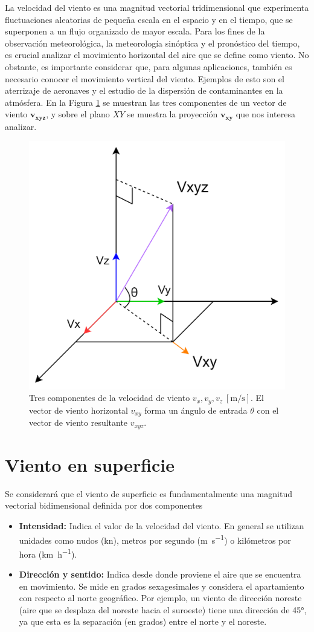  La velocidad del viento es una magnitud vectorial tridimensional que experimenta fluctuaciones aleatorias de pequeña escala en el espacio y en el tiempo, que se superponen a un flujo organizado de mayor escala. Para los fines de la observación meteorológica, la meteorología sinóptica y el pronóstico del tiempo, es crucial analizar el movimiento horizontal del aire que se define como viento. No obstante, es importante considerar que, para algunas aplicaciones, también es necesario conocer el movimiento vertical del viento. Ejemplos de esto son el aterrizaje de aeronaves y el estudio de la dispersión de contaminantes en la atmósfera. En la Figura \ref{fig:vectorVelocidad} se muestran las tres componentes de un vector de viento $\mathbf{v_{xyz}}$, y sobre el plano $XY$ se muestra la proyección $\mathbf{v_{xy}}$ que nos interesa analizar.

\begin{figure}[H]
    \centering
    \includegraphics[width=0.5\linewidth]{Figuras/introduccion/vectorVelocidad.png}
    \caption{Tres componentes de la velocidad de viento $v_{x}, v_{y}, v_{z}\  [\unit{\meter\per\second}]$. El vector de viento horizontal $v_{xy}$ forma un ángulo de entrada $\theta$ con el vector de viento resultante $v_{xyz}$.} 
    \label{fig:vectorVelocidad}
\end{figure}
\section{Viento en superficie}\label{sec:vientoEnSuperficie}
Se considerará que el viento de superficie es fundamentalmente una magnitud vectorial bidimensional definida por dos componentes
\begin{itemize}
    \item \textbf{Intensidad:} Indica el valor de la velocidad del viento. En general se utilizan unidades como nudos (\unit{\knot}), metros por segundo (\unit{\meter\per\second}) o kilómetros por hora (\unit{\kilo\meter\per\hour}).
    \item \textbf{Dirección y sentido:} Indica desde donde proviene el aire que se encuentra en movimiento. Se mide en grados sexagesimales y considera el apartamiento con respecto al norte geográfico. Por ejemplo, un viento de dirección noreste (aire que se desplaza del noreste hacia el suroeste) tiene una dirección de 45°, ya que esta es la separación (en grados) entre el norte y el noreste.
\end{itemize}

